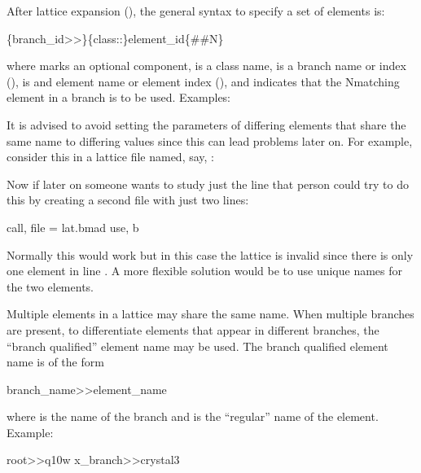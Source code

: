 {{{After lattice expansion (), the general syntax to specify a set of elements is:
\begin{example}
  \{branch_id>>\}\{class::\}element_id\{##N\}
\end{example}
where  marks an optional component,  is a class name,  is a
branch name or index (),  is and element name or element index
(), and  indicates that the N\Th matching element in a branch is to be
used. Examples:

 It is advised to avoid setting the parameters of differing elements that share the same
name to differing values since this can lead problems later on. For example, consider this in a
lattice file named, say, :
Now if later on someone wants to study just the  line that person could try to do this by
creating a second file with just two lines:
\begin{example}
  call, file = lat.bmad
  use, b
\end{example}
Normally this would work but in this case the lattice is invalid since there is only one 
element in line . A more flexible solution would be to use unique names for the two 
elements.

Multiple elements in a lattice may share the same name.  When multiple branches are present, to
differentiate elements that appear in different branches, the ``branch qualified'' element name may
be used. The branch qualified element name is of the form
\begin{example}
  branch_name>>element_name
\end{example}
where  is the name of the branch and  is the ``regular'' name of
the element. Example:
\begin{example}
  root>>q10w
  x_branch>>crystal3
\end{example}

}}}
